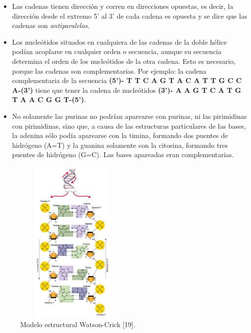 \begin{itemize}
	\item Las cadenas tienen dirección y corren en direcciones opuestas, es decir, la dirección desde el extremo 5' al 3' de cada cadena es opuesta y se 				dice que las cadenas son \textit{antiparalelas}.
	\item Los nucleótidos situados en cualquiera de las cadenas de la doble hélice podían acoplarse en cualquier orden o secuencia, aunque su secuencia 			determina el orden de los nucleótidos de la otra cadena. Esto es necesario, porque las cadenas son complementarias. Por ejemplo: la cadena 				complementaria de la secuencia \textbf{(5')- T T C A G T A C A T T G C C A-(3')} tiene que tener la cadena de nucleótidos \textbf{(3')- A A G 				T C A T G T A A C G G T-(5')}.
	\item No solamente las purinas no podrían aparearse con purinas, ni las pirimidinas con pirimidinas, sino que, a causa de las estructuras particulares 				de las bases, la adenina sólo podía aparearse con la timina, formando dos puentes de hidrógeno (A=T) y la guanina solamente con la citosina, 				formando tres puentes de hidrógeno (G=C). Las bases apareadas eran complementarias.
\end{itemize}

\begin{figure} [h]
	\begin{center}
		\includegraphics[width=2.2209in,height=3.2000in]{image/watson.jpg}
		\caption{Modelo estructural Watson-Crick [19].}
	\end{center}
\end{figure}	

